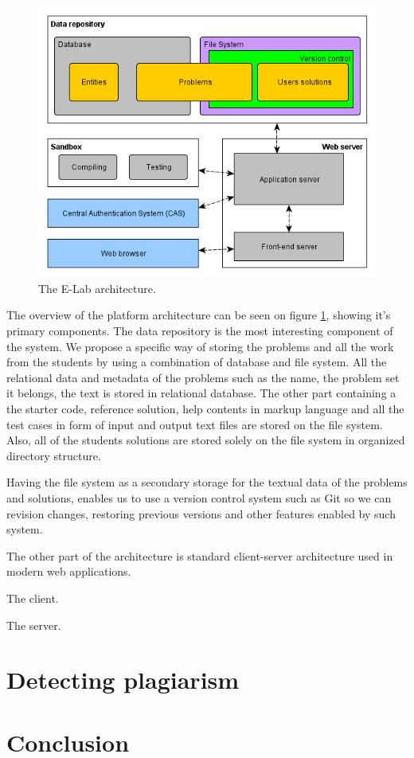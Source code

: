 \documentclass{article}
\begin{document}
\begin{figure}
\centering
\includegraphics[width=.99\textwidth]{e-lab/architecture}
\caption{The E-Lab architecture.}
\label{fig:architecture}
\end{figure}

The overview of the platform architecture can be seen on figure
\ref{fig:architecture}, showing it's primary components. The data repository
is the most interesting component of the system. We propose a specific way of
storing the problems and all the work from the students by using a combination
of database and file system. All the relational data and metadata of the
problems such as the name, the problem set it belongs, the text is stored in
relational database. The other part containing a the starter code, reference
solution, help contents in markup language and all the test cases in form of
input and output text files are stored on the file system. Also, all of the
students solutions are stored solely on the file system in organized directory
structure.

Having the file system as a secondary storage for the textual data of the
problems and solutions, enables us to use a version control system such as Git
so we can revision changes, restoring previous versions and other features
enabled by such system.

The other part of the architecture is standard client-server architecture used
in modern web applications. 

The client.

The server.


\section{Detecting plagiarism}

\section{Conclusion}




\end{document}
